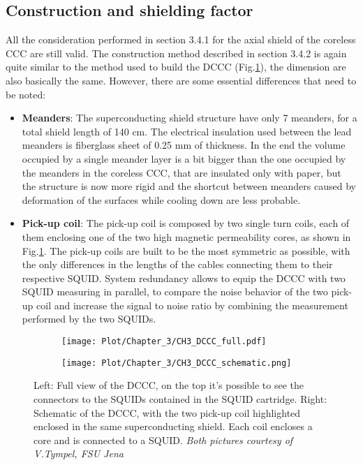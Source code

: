 \documentclass[12pt,a4paper]{report}
\begin{document}
       \subsection{Construction and shielding factor}
       All the consideration performed in section 3.4.1 for the axial shield of the coreless CCC are still valid. The construction method described in section 3.4.2 is again quite similar to the method used to build the DCCC (Fig.\ref{CH3_DCCC_schematic}), the dimension are also basically the same. However, there are some essential differences that need to be noted:
       \begin{itemize}
       	\item \textbf{Meanders}: The superconducting shield structure have only 7 meanders, for a total shield length of 140 cm. The electrical insulation used between the lead meanders is fiberglass sheet of 0.25 mm of thickness. In the end the volume occupied by a single meander layer is a bit bigger than the one occupied by the meanders in the coreless CCC, that are insulated only with paper, but the structure is now more rigid and the shortcut between meanders caused by deformation of the surfaces while cooling down are less probable. 
       	\item \textbf{Pick-up coil}: The pick-up coil is composed by two single turn coils, each of them enclosing one of the two high magnetic permeability cores, as shown in Fig.\ref{CH3_DCCC_schematic}. The pick-up coils are built to be the most symmetric as possible, with the only differences in the lengths of the cables connecting them to their respective SQUID. System redundancy allows to equip the DCCC with two SQUID measuring in parallel, to compare the noise behavior of the two pick-up coil and increase the signal to noise ratio by combining the measurement performed by the two SQUIDs.
       \end{itemize}
       \begin{figure}[H]
       	\begin{subfigure}[b]{0.5\textwidth}
       		\centering
       		\texttt{[image: Plot/Chapter\_3/CH3\_DCCC\_full.pdf]}
       	\end{subfigure}
       	\hfill
       	\begin{subfigure}[b]{0.6\textwidth}
       		\centering
       		\texttt{[image: Plot/Chapter\_3/CH3\_DCCC\_schematic.png]}
       	\end{subfigure}
       	\caption{\small{Left: Full view of the DCCC, on the top it's possible to see the connectors to the SQUIDs contained in the SQUID cartridge. Right: Schematic of the DCCC, with the two pick-up coil highlighted enclosed in the same superconducting shield. Each coil encloses a core and is connected to a SQUID. \textit{Both pictures courtesy of V.Tympel, FSU Jena}}}
       	\label{CH3_DCCC_schematic}
       \end{figure}
\end{document}
